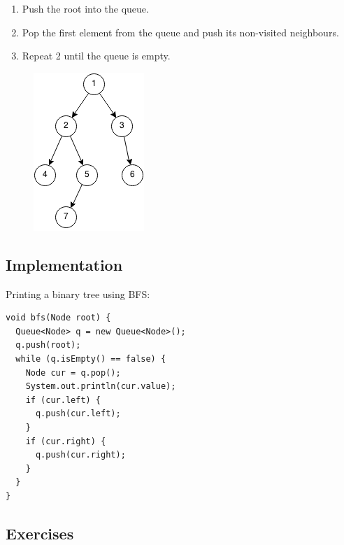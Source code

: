 \documentclass[11pt,oneside]{book}
\makeatletter
\def\maxwidth#1{\ifdim\Gin@nat@width>#1 #1\else\Gin@nat@width\fi}
\makeatother
\begin{document}
\begin{enumerate}
\item Push the root into the queue.
\item Pop the first element from the queue and push its non-visited neighbours.
\item Repeat 2 until the queue is empty.
\end{enumerate}

\vspace{5px}\begin{figure}[H]\centering
        \includegraphics[width=0.66\maxwidth{\textwidth}]{bfs.png}
        \end{figure}

\subsection{Implementation}

Printing a binary tree using BFS:

\begin{lstlisting}
void bfs(Node root) {
  Queue<Node> q = new Queue<Node>();
  q.push(root);
  while (q.isEmpty() == false) {
    Node cur = q.pop();
    System.out.println(cur.value);
    if (cur.left) {
      q.push(cur.left);
    }
    if (cur.right) {
      q.push(cur.right);
    }
  }
}
\end{lstlisting}

\subsection{Exercises}
\end{document}
